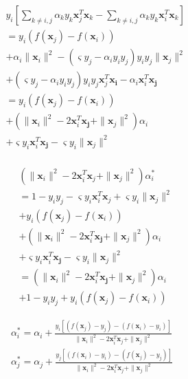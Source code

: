 \documentclass[a4paper,12pt]{article}
\begin{document}
        \begin{equation}
            \begin{split}
                &y_i\left[\sum_{k\neq i,j}\alpha_ky_k\bm{x}_j^T\bm{x}_k-\sum_{k\neq i,j}\alpha_ky_k\bm{x}_i^T\bm{x}_k\right]\\
                &=y_i\left(f(\bm{x}_j)-f(\bm{x}_i)\right)\\
                &+\alpha_i\|\bm{x}_i\|^2-(\varsigma y_j-\alpha_iy_iy_j)y_iy_j\|\bm{x}_j\|^2\\
                &+(\varsigma y_j-\alpha_iy_iy_j)y_iy_j\bm{x}_j^T\bm{x_i}-\alpha_i\bm{x}_i^T\bm{x_j}\\
                &=y_i\left(f(\bm{x}_j)-f(\bm{x}_i)\right)\\
                &+\left(\|\bm{x}_i\|^2-2\bm{x}_i^T\bm{x_j}+\|\bm{x}_j\|^2\right)\alpha_i\\
                &+\varsigma y_i\bm{x}_i^T\bm{x_j}-\varsigma y_i\|\bm{x}_j\|^2\\
            \end{split}
        \end{equation}

        \begin{equation}
            \begin{split}
                &(\|\bm{x}_i\|^2-2\bm{x}_i^T\bm{x}_j+\|\bm{x}_j\|^2)\alpha_i^*\\
                &=1-y_iy_j-\varsigma y_i\bm{x}_i^T\bm{x}_j+\varsigma y_i\|\bm{x}_j\|^2\\
                &+y_i\left(f(\bm{x}_j)-f(\bm{x}_i)\right)\\
                &+\left(\|\bm{x}_i\|^2-2\bm{x}_i^T\bm{x_j}+\|\bm{x}_j\|^2\right)\alpha_i\\
                &+\varsigma y_i\bm{x}_i^T\bm{x_j}-\varsigma y_i\|\bm{x}_j\|^2\\
                &=\left(\|\bm{x}_i\|^2-2\bm{x}_i^T\bm{x_j}+\|\bm{x}_j\|^2\right)\alpha_i\\
                &+1-y_iy_j+y_i\left(f(\bm{x}_j)-f(\bm{x}_i)\right)
            \end{split}
        \end{equation}

        \begin{equation}
            \begin{split}
                \alpha_i^*=\alpha_i+\frac{y_i\left[(f(\bm{x}_j)-y_j)-(f(\bm{x}_i)-y_i)\right]}{\|\bm{x}_i\|^2-2\bm{x}_i^T\bm{x}_j+\|\bm{x}_j\|^2}\\
                \alpha_j^*=\alpha_j+\frac{y_j\left[(f(\bm{x}_i)-y_i)-(f(\bm{x}_j)-y_j)\right]}{\|\bm{x}_i\|^2-2\bm{x}_i^T\bm{x}_j+\|\bm{x}_j\|^2}
            \end{split}
        \end{equation}
\end{document}
